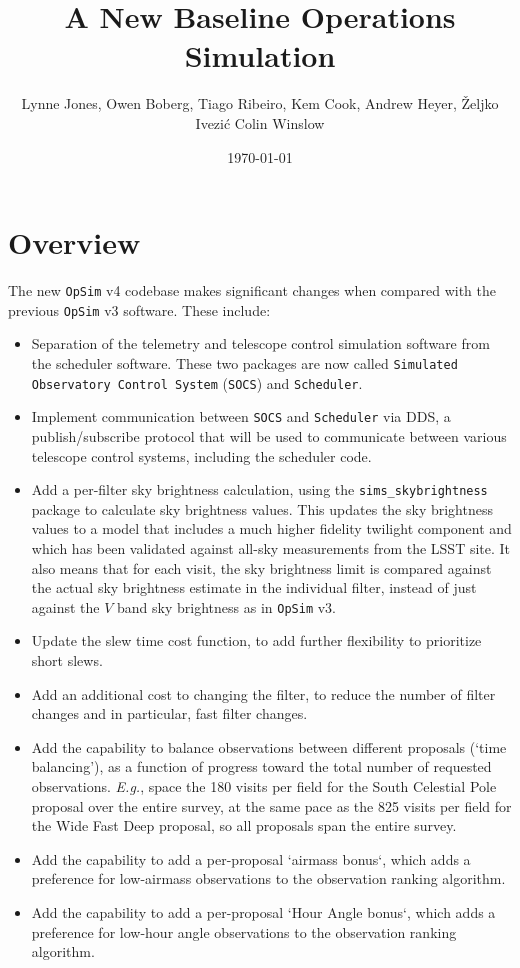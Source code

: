 \documentclass[DM,lsstdraft,authoryear,toc]{lsstdoc}
\title{A New Baseline Operations Simulation}
\author{%
Lynne Jones, 
Owen Boberg,
Tiago Ribeiro,
Kem Cook,
Andrew Heyer,
\v{Z}eljko Ivezi\'{c}
Colin Winslow
}
\date{\today}
\newcommand{\opsim}{\texttt{OpSim}\xspace}
\newcommand{\socs}{\texttt{SOCS}\xspace}
\newcommand{\sched}{\texttt{Scheduler}\xspace}
\newcommand{\simsky}{\texttt{sims\_skybrightness}\xspace}
\begin{document}
\maketitle

\section{Overview}

The new \opsim v4 codebase makes significant changes when compared with the previous \opsim v3 software. These include: 
\begin{itemize}
\item Separation of the telemetry and telescope control simulation software from the scheduler software. These two packages are now called \texttt{Simulated Observatory Control System} (\socs) and \texttt{Scheduler}. 
\item Implement communication between \socs and \sched via DDS, a publish/subscribe protocol that will be used to communicate between various telescope control systems, including the scheduler code.
\item Add a per-filter sky brightness calculation, using the \simsky package to calculate sky brightness values. This updates the sky brightness values to a model that includes a much higher fidelity twilight component and which has been validated against all-sky measurements from the LSST site. It also means that for each visit, the sky brightness limit is compared against the actual sky brightness estimate in the individual filter, instead of just against the $V$ band sky brightness as in \opsim v3.
\item Update the slew time cost function, to add further flexibility to prioritize short slews.
\item Add an additional cost to changing the filter, to reduce the number of filter changes and in particular, fast filter changes.
\item Add the capability to balance observations between different proposals (`time balancing'), as a function of progress toward the total number of requested observations. {\it E.g.}, space the 180 visits per field for the South Celestial Pole proposal over the entire survey, at the same pace as the 825 visits per field for the Wide Fast Deep proposal, so all proposals span the entire survey.
\item Add the capability to add a per-proposal `airmass bonus`, which adds a preference for low-airmass observations to the observation ranking algorithm.
\item Add the capability to add a per-proposal `Hour Angle bonus`, which adds a preference for low-hour angle observations to the observation ranking algorithm. 
\end{itemize}
\end{document}
